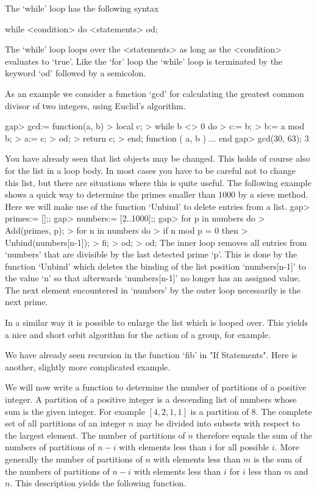 The  `while' loop has the following syntax

\)\fmark while <condition> do <statements>  od; 

The `while'  loop loops over the <statements>  as long as  the 
<condition> evaluates  to  `true'. Like the `for' loop the `while' loop 
is terminated by the keyword `od' followed by a semicolon.

As an example we consider a function `gcd' for calculating the greatest 
common divisor of two integers, using Euclid's algorithm. 

\beginexample
    gap> gcd:= function(a, b)
    >       local c;
    >       while b <> 0 do
    >          c:= b;
    >          b:= a mod b;
    >          a:= c;
    >       od;
    >       return c;
    >    end;
    function ( a, b ) ... end
    gap> gcd(30, 63);
    3
\endexample

You have already seen that list objects may be  changed.   This holds  of
course also for the  list in a loop body.  In most  cases  you have to be
careful not  to change this list, but there are situations  where this is
quite useful.  The following example  shows a quick way  to determine the
primes smaller than 1000 by a sieve method.  Here we will make use of the
function `Unbind' to delete entries from a list.
\beginexample
    gap> primes:= [];;
    gap> numbers:= [2..1000];;
    gap> for p in numbers do
    >       Add(primes, p);
    >       for n in numbers do
    >          if n mod p = 0 then
    >             Unbind(numbers[n-1]);
    >          fi;
    >       od;
    >    od;
\endexample
The inner loop  removes all entries from `numbers' that are  divisible by
the last detected prime `p'.  This is done by the function `Unbind' which
deletes the binding of the list position  `numbers[n-1]' to the value `n'
so that afterwards `numbers[n-1]' no longer has  an  assigned value.  The
next  element encountered in `numbers'  by the outer  loop necessarily is
the next prime.

In a similar way it is possible to enlarge the list which is looped over.
This yields a nice and short orbit  algorithm for the  action of a group,
for example.


We  have  already seen recursion  in the  function `fib' in "If Statements".
Here is another, slightly more complicated example.

We will now write  a function to  determine the number of partitions of a
positive integer.  A partition of a positive integer is a descending list
of  numbers whose sum is the given integer.  For example $[4,2,1,1]$ is a
partition of 8.  The complete set of all partitions of an integer $n$ may
be divided into subsets with respect to the largest  element.  The number
of  partitions of  $n$  therefore  equals  the  sum  of  the  numbers  of
partitions  of $n-i$ with  elements less than  $i$ for all possible  $i$.
More generally the  number of partitions of  $n$ with elements  less than
$m$ is the sum  of  the numbers of partitions of $n-i$ with elements less
than  $i$ for $i$ less than  $m$ and  $n$.  This description  yields  the
following function.

